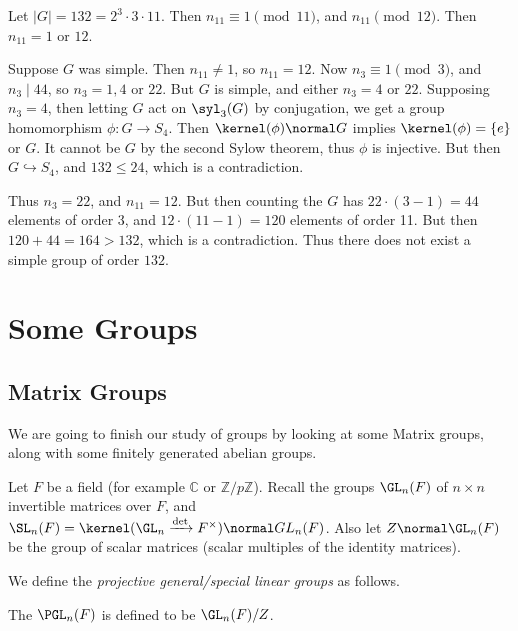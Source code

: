 \documentclass[a4paper]{scrartcl}
\begin{document}
\begin{example}
	Let $|G| = 132 = 2^3 \cdot 3 \cdot 11$. Then $n_{11} \equiv 1 \pmod{11}$, and $n_{11} \pmod 12$. Then $n_{11} = 1$ or $12$. 

	Suppose $G$ was simple. Then $n_{11} \neq 1$, so $n_{11} = 12$. Now $n_3 \equiv 1 \pmod{3}$, and $n_3 \mid 44$, so $n_3 = 1, 4$ or $22$. But $G$ is simple, and either $n_3 = 4$ or $22$. Supposing $n_3 = 4$, then letting $G$ act on $\syl_3(G)$ by conjugation, we get a group homomorphism $\phi: G \rightarrow S_4$. Then $\kernel(\phi) \normal G$ implies $\kernel(\phi) = \{e\}$ or $G$. It cannot be $G$ by the second Sylow theorem, thus $\phi$ is injective. But then $G \hookrightarrow S_4$, and $132 \leq 24$, which is a contradiction.

	Thus $n_3 = 22$, and $n_11 = 12$. But then counting the $G$ has $22 \cdot (3 - 1) = 44$ elements of order 3, and $12 \cdot (11 - 1) = 120$ elements of order 11. But then $120 + 44 = 164 > 132$, which is a contradiction. Thus there does not exist a simple group of order $132$. 
\end{example}

\section{Some Groups}

\subsection{Matrix Groups}

We are going to finish our study of groups by looking at some Matrix groups, along with some finitely generated abelian groups.


Let $F$ be a field (for example $\mathbb{C}$ or $\mathbb{Z}/p\mathbb{Z}$). 
Recall the groups $\GL_n(F)$ of $n \times n$ 
invertible matrices over $F$, and $\SL_n(F) = \kernel(\GL_n \xrightarrow{\det} F^\times) \normal GL_n(F)$.
Also let $Z \normal \GL_n(F)$ be the group of scalar matrices (scalar multiples of the identity matrices). 

We define the \emph{projective general/special linear groups} as follows.

\begin{definition}
	The  $\PGL_n(F)$ is defined to be $\GL_n(F) / Z$.
\end{definition}
\end{document}
